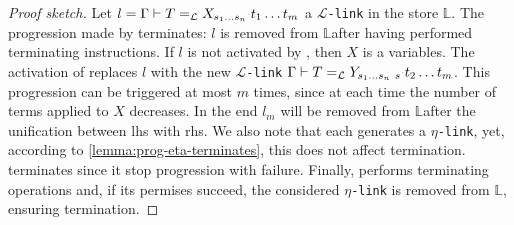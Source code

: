 \documentclass[sigconf,natbib=false,review]{acmart}
\newcommand{\appsep}{\ensuremath{\textcolor{lightgray}{\cdot}}}
\newcommand{\llambda}{\ensuremath{\mathcal{L}}\xspace}
\newcommand{\linkMacro}[1]{\ensuremath{#1}\texttt{-link}\xspace}
\newcommand{\linkbeta}{\linkMacro{\llambda}}
\newcommand{\linketa} {\linkMacro{\eta}}
\newcommand{\linkbetaM}[3]{\ensuremath{#1 \vdash #2 =_{\llambda} #3}}
\newcommand{\lhs}{lhs\xspace}
\newcommand{\rhs}{rhs\xspace}
\newcommand{\linkStore}{\texorpdfstring{\ensuremath{\mathbb{L}}\xspace}{L}}
\begin{document}
\begin{proof}[Proof sketch]
  Let $l = \linkbetaM{\Gamma}{T}{\rhsBeta}$ a \linkbeta in the store \linkStore.
  The progression made by \progBetaRH{} terminates: $l$ is removed from
  \linkStore after having performed terminating instructions. If $l$ is not
  activated by \progBetaRH, then $X$ is a variables. The activation
  of \progBetaLL replaces $l$ with the new \linkbeta 
  $\linkbetaM{\Gamma}{T}{Y_{s_1\dots s_n~s}\appsep t_2\dots t_m}$.
  This progression can be triggered at most $m$ times, since at each time
  the number of terms applied to $X$ decreases. In the end $l_m$
  will be removed from \linkStore after the unification between \lhs with \rhs.
  We also note that each \progBetaLL generates a \linketa, yet, according to
  \cref{lemma:prog-eta-terminates}, this does not affect termination. 
  \progBetaFail terminates since it stop progression with failure.
  Finally, \progressetaright performs 
  terminating operations and, if its permises succeed, the considered
  \linketa is removed from \linkStore, ensuring termination.
\end{proof}


\end{document}
